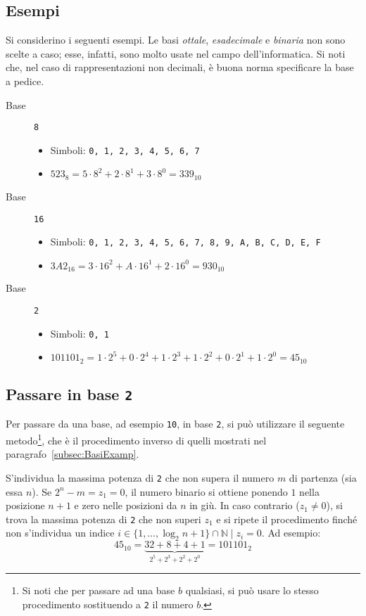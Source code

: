 		\subsection{Esempi}
		\label{subsec:BasiExamp}
Si considerino i seguenti esempi. Le basi \emph{ottale}, \emph{esadecimale} e \emph{binaria} non sono scelte a caso; esse, infatti, sono molto usate nel campo dell'informatica. Si noti che, nel caso di rappresentazioni non decimali, è buona norma specificare la base a pedice.
\begin{description}
\item[Base] \lstinline!8!
	\begin{itemize}
		\item
Simboli: \lstinline!0, 1, 2, 3, 4, 5, 6, 7!
		\item
$523_8=5\cdot8^2+2\cdot8^1+3\cdot8^0=339_{10}$
	\end{itemize}
\item[Base] \lstinline!16!
	\begin{itemize}
		\item
Simboli: \lstinline!0, 1, 2, 3, 4, 5, 6, 7, 8, 9, A, B, C, D, E, F!
		\item
$3A2_{16}=3\cdot16^2+A\cdot16^1+2\cdot16^0=930_{10}$
	\end{itemize}
\item[Base] \lstinline!2!
	\begin{itemize}
		\item
Simboli: \lstinline!0, 1!
		\item
$101101_{2}=1\cdot2^5+0\cdot2^4+1\cdot2^3+1\cdot2^2+0\cdot2^1+1\cdot2^0=45_{10}$
	\end{itemize}
\end{description}

		\subsection{Passare in base \lstinline!2!}
Per passare da una base, ad esempio \lstinline!10!, in base \lstinline!2!, si può utilizzare il seguente metodo\footnote{Si noti che per passare ad una base $b$ qualsiasi, si può usare lo stesso procedimento sostituendo a \lstinline!2! il numero $b$.}, che è il procedimento inverso di quelli mostrati nel paragrafo~\vref{subsec:BasiExamp}.

S'individua la massima potenza di \lstinline!2! che non supera il numero $m$ di partenza (sia essa $n$). Se $2^n-m=z_1=0$, il numero binario si ottiene ponendo $1$ nella posizione $n+1$ e zero nelle posizioni da $n$ in giù. In caso contrario ($z_1\neq0$), si trova la massima potenza di \lstinline!2! che non superi $z_1$ e si ripete il procedimento finché non s'individua un indice $i\in\{1,\dots,\log_2n+1\}\cap\mathbb{N} \mid z_{i}=0$. Ad esempio:
\[
45_{10}=\underbrace{32+8+4+1}_{2^5+2^3+2^2+2^0}=101101_{2}
\]

